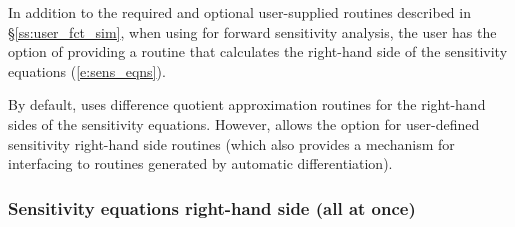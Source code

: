 In addition to the required and optional user-supplied routines described
in \S\ref{ss:user_fct_sim}, when using {\cvodes} for forward sensitivity analysis,
the user has the option of providing a routine that calculates the right-hand side 
of the sensitivity equations (\ref{e:sens_eqns}).

By default, {\cvodes} uses difference quotient approximation routines for the right-hand
sides of the sensitivity equations.
However, {\cvodes} allows the option for user-defined sensitivity right-hand side routines
(which also provides a mechanism for interfacing {\cvodes} to routines
generated by automatic differentiation).

\subsubsection{Sensitivity equations right-hand side (all at once)}

